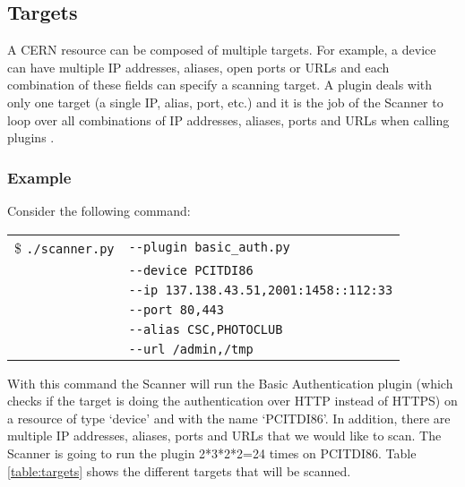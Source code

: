 \subsection{Targets}
A CERN resource can be composed of multiple targets. For example, a device can have multiple IP addresses, aliases, open ports or URLs and each combination of these fields can specify a scanning target. A plugin deals with only one target (a single IP, alias, port, etc.) and it is the job of the Scanner to loop over all combinations of IP addresses, aliases, ports and URLs when calling plugins .
\subsubsection{Example}
Consider the following command:

\begin{table}[H]
\begin{center}
    \begin{tabular}{ c  l }


\$ \texttt{./scanner.py} &  \texttt{-{}-plugin basic\_auth.py}  \\
			   &  \texttt{-{}-device PCITDI86}  \\
			   &  \texttt{-{}-ip 137.138.43.51,2001:1458::112:33} \\
	           &  \texttt{-{}-port 80,443  }\\
	           &   \texttt{-{}-alias CSC,PHOTOCLUB}  \\
    	       &  \texttt{-{}-url /admin,/tmp}
    	       
	\end{tabular}
    
   \end{center}
\end{table}
\noindent
With this command the Scanner will run the Basic Authentication plugin (which checks if the target is doing the authentication over HTTP instead of HTTPS) on a resource of type `device' and with the name `PCITDI86'. In addition, there are multiple IP addresses, aliases, ports and URLs that we would like to scan. The Scanner is going to run the plugin 2*3*2*2=24 times on PCITDI86. Table \ref{table:targets} shows the different targets that will be scanned. 

